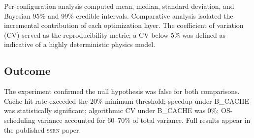 Per-configuration analysis computed mean, median, standard deviation, and
Bayesian 95\% and 99\% credible intervals. Comparative analysis isolated the
incremental contribution of each optimization layer. The coefficient of variation
(CV) served as the reproducibility metric; a CV below 5\% was defined as
indicative of a highly deterministic physics model.

\subsection*{Outcome}

The experiment confirmed the null hypothesis was false for both comparisons.
Cache hit rate exceeded the 20\% minimum threshold; speedup under B\_CACHE
was statistically significant; algorithmic CV under B\_CACHE was 0\%;
OS-scheduling variance accounted for 60--70\% of total variance. Full results
appear in the published \textsc{ssrn} paper.
